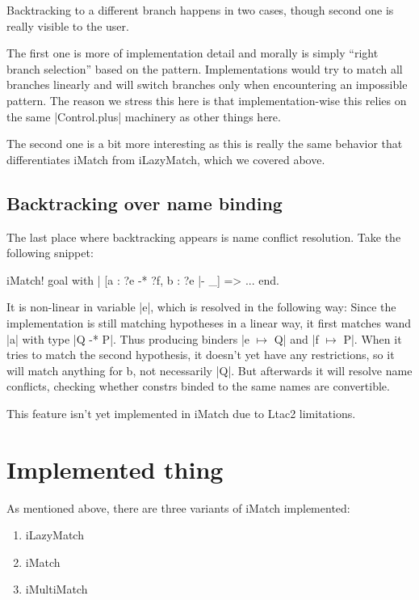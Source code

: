 Backtracking to a different branch happens in two cases, though second one is really visible to the user.

The first one is more of implementation detail and morally is simply ``right branch selection'' based on the pattern.
Implementations would try to match all branches linearly and will switch branches only when encountering an impossible pattern.
The reason we stress this here is that implementation-wise this relies on the same \coqe|Control.plus| machinery as other things here.

The second one is a bit more interesting as this is really the same behavior that differentiates iMatch from iLazyMatch, which we covered above.

\subsection{Backtracking over name binding}

The last place where backtracking appears is name conflict resolution.
Take the following snippet:

\begin{coq}
iMatch! goal with
| [a : ?e -* ?f, b : ?e |- _] => ...
end.
\end{coq}

It is non-linear in variable \coqe|e|, which is resolved in the following way:
Since the implementation is still matching hypotheses in a linear way, it first matches wand \coqe|a| with type \coqe|Q -* P|.
Thus producing binders \coqe|e $\mapsto$ Q| and \coqe|f $\mapsto$ P|.
When it tries to match the second hypothesis, it doesn't yet have any restrictions, so it will match anything for b, not necessarily \coqe|Q|.
But afterwards it will resolve name conflicts, checking whether constrs binded to the same names are convertible.

This feature isn't yet implemented in iMatch due to Ltac2 limitations.

\section{Implemented thing}

As mentioned above, there are three variants of iMatch implemented:
\begin{enumerate}
\item iLazyMatch
\item iMatch
\item iMultiMatch
\end{enumerate}

